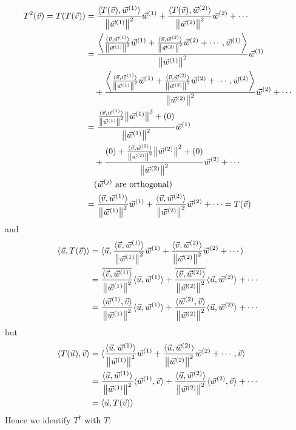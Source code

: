 \begin{align*}
T^2(\vec{v}) = T(T(\vec{v})) &= \frac{\langle T(\vec{v}), \vec{w}^{(1)}\rangle}{\norm{\vec{w}^{(1)}}^2} \vec{w}^{(1)} + \frac{\langle T(\vec{v}), \vec{w}^{(2)}\rangle}{\norm{\vec{w}^{(2)}}^2} \vec{w}^{(2)} + \cdots \\
&= \frac{\left\langle \frac{\langle \vec{v}, \vec{w}^{(1)}\rangle}{\norm{\vec{w}^{(1)}}^2} \vec{w}^{(1)} + \frac{\langle \vec{v}, \vec{w}^{(2)}\rangle}{\norm{\vec{w}^{(2)}}^2} \vec{w}^{(2)} + \cdots, \vec{w}^{(1)}\right\rangle}{\norm{\vec{w}^{(1)}}^2} \vec{w}^{(1)} \\
&\quad+ \frac{\left\langle \frac{\langle \vec{v}, \vec{w}^{(1)}\rangle}{\norm{\vec{w}^{(1)}}^2} \vec{w}^{(1)} + \frac{\langle \vec{v}, \vec{w}^{(2)}\rangle}{\norm{\vec{w}^{(2)}}^2} \vec{w}^{(2)} + \cdots, \vec{w}^{(2)}\right\rangle}{\norm{\vec{w}^{(2)}}^2} \vec{w}^{(2)} + \cdots \\
&= \frac{\frac{\langle \vec{v}, \vec{w}^{(1)}\rangle}{\norm{\vec{w}^{(1)}}^2} \norm{\vec{w}^{(1)}}^2 + (0)}{\norm{\vec{w}^{(1)}}^2} \vec{w}^{(1)} \\
&\quad+ \frac{(0) + \frac{\langle \vec{v}, \vec{w}^{(2)}\rangle}{\norm{\vec{w}^{(2)}}^2} \norm{\vec{w}^{(2)}}^2 + (0)}{\norm{\vec{w}^{(2)}}^2} \vec{w}^{(2)} + \cdots \\
&\quad \text{($\vec{w}^{(j)}$ are orthogonal)} \\
&= \frac{\langle \vec{v}, \vec{w}^{(1)}\rangle}{\norm{\vec{w}^{(1)}}^2} \vec{w}^{(1)} + \frac{\langle \vec{v}, \vec{w}^{(2)}\rangle}{\norm{\vec{w}^{(2)}}^2} \vec{w}^{(2)} + \cdots = T(\vec{v})
\end{align*}
and
\begin{align*}
\langle \vec{u}, T(\vec{v}) \rangle &= \langle \vec{u}, \frac{\langle \vec{v}, \vec{w}^{(1)}\rangle}{\norm{\vec{w}^{(1)}}^2} \vec{w}^{(1)} + \frac{\langle \vec{v}, \vec{w}^{(2)}\rangle}{\norm{\vec{w}^{(2)}}^2} \vec{w}^{(2)} + \cdots \rangle \\
&= \frac{\overline{\langle \vec{v}, \vec{w}^{(1)}\rangle}}{\norm{\vec{w}^{(1)}}^2} \langle \vec{u}, \vec{w}^{(1)} \rangle + \frac{\overline{\langle \vec{v}, \vec{w}^{(2)}\rangle}}{\norm{\vec{w}^{(2)}}^2} \langle \vec{u}, \vec{w}^{(2)} \rangle + \cdots \\
&= \frac{\langle \vec{w}^{(1)}, \vec{v} \rangle}{\norm{\vec{w}^{(1)}}^2} \langle \vec{u}, \vec{w}^{(1)} \rangle + \frac{\langle \vec{w}^{(2)}, \vec{v}\rangle}{\norm{\vec{w}^{(2)}}^2} \langle \vec{u}, \vec{w}^{(2)} \rangle + \cdots 
\end{align*}
but
\begin{align*}
\langle T(\vec{u}), \vec{v} \rangle &= \langle \frac{\langle \vec{u}, \vec{w}^{(1)}\rangle}{\norm{\vec{w}^{(1)}}^2} \vec{w}^{(1)} + \frac{\langle \vec{u}, \vec{w}^{(2)}\rangle}{\norm{\vec{w}^{(2)}}^2} \vec{w}^{(2)} + \cdots, \vec{v} \rangle \\
&= \frac{\langle \vec{u}, \vec{w}^{(1)}\rangle}{\norm{\vec{w}^{(1)}}^2} \langle \vec{w}^{(1)}, \vec{v} \rangle + \frac{\langle \vec{u}, \vec{w}^{(2)}\rangle}{\norm{\vec{w}^{(2)}}^2} \langle \vec{w}^{(2)}, \vec{v} \rangle + \cdots \\
&= \langle \vec{u}, T(\vec{v}) \rangle
\end{align*}
Hence we identify $T^\dag$ with $T$.

